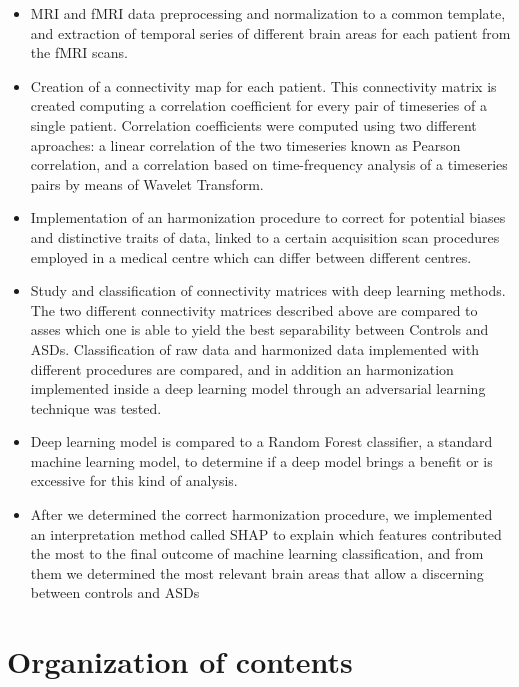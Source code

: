 \documentclass[10pt]{report}
\begin{document}
\begin{itemize}
\item MRI and fMRI data preprocessing and normalization to a common template, and extraction of temporal series of different brain areas for each patient from the fMRI scans.
\item Creation of a connectivity map for each patient. This connectivity matrix is created computing a correlation coefficient for every pair of timeseries of a single patient. Correlation coefficients were computed using two different aproaches: a linear correlation of the two timeseries known as Pearson correlation, and a correlation based on time-frequency analysis of a timeseries pairs by means of Wavelet Transform.
\item Implementation of an harmonization procedure to correct for potential biases and distinctive traits of data, linked to a certain acquisition scan procedures employed in a medical centre which can differ between different centres.
\item Study and classification of connectivity matrices with deep learning methods. The two different connectivity matrices described above are compared to asses which one is able to yield the best separability between Controls and ASDs.
Classification of raw data and harmonized data implemented with different procedures are compared, and in addition an harmonization implemented inside a deep learning model through an adversarial learning technique was tested.
\item Deep learning model is compared to a Random Forest classifier, a standard machine learning model, to determine if a deep model brings a benefit or is excessive for this kind of analysis.
\item After we determined the correct harmonization procedure, we implemented an interpretation method called SHAP to explain which features contributed the most to the final outcome of machine learning classification, and from them we determined the most relevant brain areas that allow a discerning between controls and ASDs
\end{itemize}

\chapter*{Organization of contents}
\end{document}
